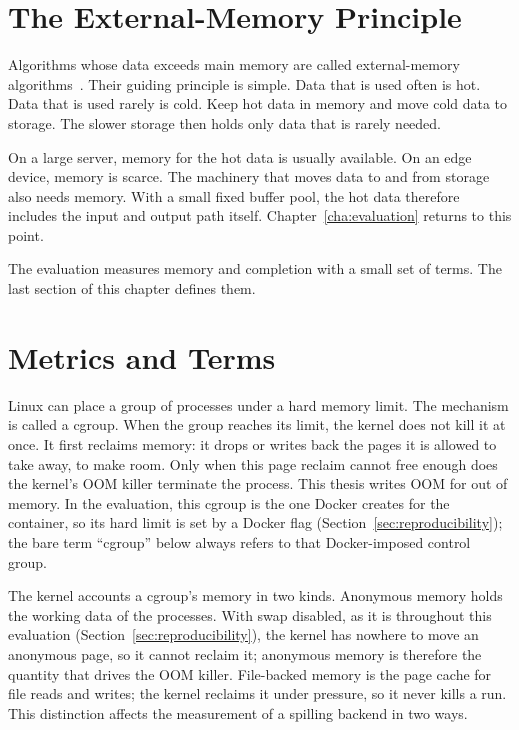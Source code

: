 \section{The External-Memory Principle\label{sec:bg-extmem}}

Algorithms whose data exceeds main memory are called external-memory algorithms~\cite{graefe1993}.
Their guiding principle is simple.
Data that is used often is hot.
Data that is used rarely is cold.
Keep hot data in memory and move cold data to storage.
The slower storage then holds only data that is rarely needed.

On a large server, memory for the hot data is usually available.
On an edge device, memory is scarce.
The machinery that moves data to and from storage also needs memory.
With a small fixed buffer pool, the hot data therefore includes the input and output path itself.
Chapter~\ref{cha:evaluation} returns to this point.

The evaluation measures memory and completion with a small set of terms.
The last section of this chapter defines them.

\section{Metrics and Terms\label{sec:bg-metrics}}

Linux can place a group of processes under a hard memory limit.
The mechanism is called a \ac{cgroup}.
When the group reaches its limit, the kernel does not kill it at once.
It first reclaims memory: it drops or writes back the pages it is allowed to take away, to make room.
Only when this page reclaim cannot free enough does the kernel's OOM killer terminate the process.
This thesis writes OOM for out of memory.
In the evaluation, this cgroup is the one Docker creates for the container, so its hard limit is set by a Docker flag (Section~\ref{sec:reproducibility}); the bare term ``cgroup'' below always refers to that Docker-imposed control group.

The kernel accounts a cgroup's memory in two kinds.
Anonymous memory holds the working data of the processes.
With swap disabled, as it is throughout this evaluation (Section~\ref{sec:reproducibility}), the kernel has nowhere to move an anonymous page, so it cannot reclaim it; anonymous memory is therefore the quantity that drives the OOM killer.
File-backed memory is the page cache for file reads and writes; the kernel reclaims it under pressure, so it never kills a run.
This distinction affects the measurement of a spilling backend in two ways.

